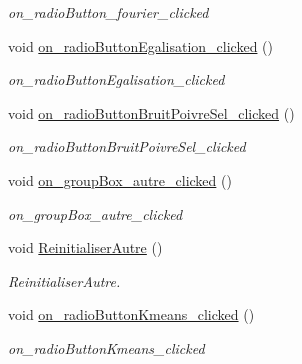 \begin{DoxyCompactItemize}
\begin{DoxyCompactList}\small\item\em on\+\_\+radio\+Button\+\_\+fourier\+\_\+clicked \end{DoxyCompactList}\item 
\mbox{\label{classMainWindow_a746e53ef1b2e87f421756acd96844096}} 
void \hyperlink{classMainWindow_a746e53ef1b2e87f421756acd96844096}{on\+\_\+radio\+Button\+Egalisation\+\_\+clicked} ()
\begin{DoxyCompactList}\small\item\em on\+\_\+radio\+Button\+Egalisation\+\_\+clicked \end{DoxyCompactList}\item 
\mbox{\label{classMainWindow_afe756729e53a981bfd2e25f0551c378b}} 
void \hyperlink{classMainWindow_afe756729e53a981bfd2e25f0551c378b}{on\+\_\+radio\+Button\+Bruit\+Poivre\+Sel\+\_\+clicked} ()
\begin{DoxyCompactList}\small\item\em on\+\_\+radio\+Button\+Bruit\+Poivre\+Sel\+\_\+clicked \end{DoxyCompactList}\item 
\mbox{\label{classMainWindow_a908bfb9e085d25a116ad56ec8e976f5d}} 
void \hyperlink{classMainWindow_a908bfb9e085d25a116ad56ec8e976f5d}{on\+\_\+group\+Box\+\_\+autre\+\_\+clicked} ()
\begin{DoxyCompactList}\small\item\em on\+\_\+group\+Box\+\_\+autre\+\_\+clicked \end{DoxyCompactList}\item 
\mbox{\label{classMainWindow_aa2fe1d15891827da32e14c28567fc66a}} 
void \hyperlink{classMainWindow_aa2fe1d15891827da32e14c28567fc66a}{Reinitialiser\+Autre} ()
\begin{DoxyCompactList}\small\item\em Reinitialiser\+Autre. \end{DoxyCompactList}\item 
\mbox{\label{classMainWindow_a78ca3c2a493a26f99743a6833a35a6f7}} 
void \hyperlink{classMainWindow_a78ca3c2a493a26f99743a6833a35a6f7}{on\+\_\+radio\+Button\+Kmeans\+\_\+clicked} ()
\begin{DoxyCompactList}\small\item\em on\+\_\+radio\+Button\+Kmeans\+\_\+clicked \end{DoxyCompactList}\item 

\end{DoxyCompactItemize}

